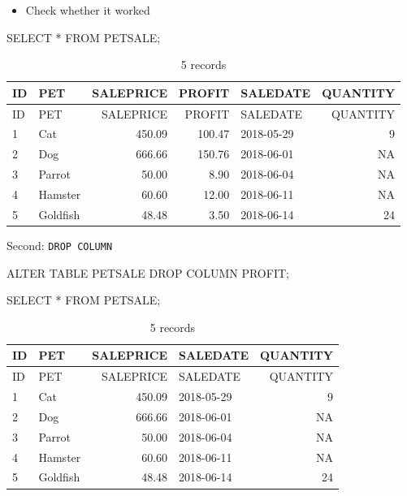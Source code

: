 \documentclass[
  letterpaper,
  DIV=11,
  numbers=noendperiod]{scrreprt}
\newenvironment{Shaded}{\begin{snugshade}}{\end{snugshade}}
\newcommand{\KeywordTok}[1]{\textcolor[rgb]{0.00,0.23,0.31}{#1}}
\newcommand{\NormalTok}[1]{\textcolor[rgb]{0.00,0.23,0.31}{#1}}
\newcommand{\OperatorTok}[1]{\textcolor[rgb]{0.37,0.37,0.37}{#1}}
\providecommand{\tightlist}{%
  \setlength{\itemsep}{0pt}\setlength{\parskip}{0pt}}\usepackage{longtable,booktabs,array}
\begin{document}
\begin{itemize}
\tightlist
\item
  Check whether it worked
\end{itemize}

\begin{Shaded}
\begin{Highlighting}[]
\KeywordTok{SELECT} \OperatorTok{*} \KeywordTok{FROM}\NormalTok{ PETSALE;}
\end{Highlighting}
\end{Shaded}

\begin{longtable}[]{@{}llrrlr@{}}
\caption{5 records}\tabularnewline
\toprule()
ID & PET & SALEPRICE & PROFIT & SALEDATE & QUANTITY \\
\midrule()
\endfirsthead
\toprule()
ID & PET & SALEPRICE & PROFIT & SALEDATE & QUANTITY \\
\midrule()
\endhead
1 & Cat & 450.09 & 100.47 & 2018-05-29 & 9 \\
2 & Dog & 666.66 & 150.76 & 2018-06-01 & NA \\
3 & Parrot & 50.00 & 8.90 & 2018-06-04 & NA \\
4 & Hamster & 60.60 & 12.00 & 2018-06-11 & NA \\
5 & Goldfish & 48.48 & 3.50 & 2018-06-14 & 24 \\
\bottomrule()
\end{longtable}

Second: \texttt{DROP\ COLUMN}

\begin{Shaded}
\begin{Highlighting}[]
\KeywordTok{ALTER} \KeywordTok{TABLE}\NormalTok{ PETSALE}
\KeywordTok{DROP} \KeywordTok{COLUMN}\NormalTok{ PROFIT;}
\end{Highlighting}
\end{Shaded}

\begin{Shaded}
\begin{Highlighting}[]
\KeywordTok{SELECT} \OperatorTok{*} \KeywordTok{FROM}\NormalTok{ PETSALE;}
\end{Highlighting}
\end{Shaded}

\begin{longtable}[]{@{}llrlr@{}}
\caption{5 records}\tabularnewline
\toprule()
ID & PET & SALEPRICE & SALEDATE & QUANTITY \\
\midrule()
\endfirsthead
\toprule()
ID & PET & SALEPRICE & SALEDATE & QUANTITY \\
\midrule()
\endhead
1 & Cat & 450.09 & 2018-05-29 & 9 \\
2 & Dog & 666.66 & 2018-06-01 & NA \\
3 & Parrot & 50.00 & 2018-06-04 & NA \\
4 & Hamster & 60.60 & 2018-06-11 & NA \\
5 & Goldfish & 48.48 & 2018-06-14 & 24 \\
\bottomrule()
\end{longtable}
\end{document}
